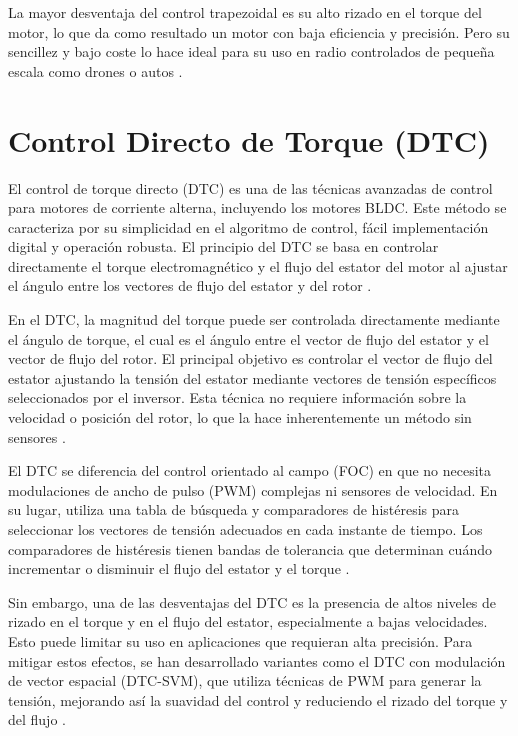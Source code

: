 \documentclass[11pt]{report}
\begin{document}
La mayor desventaja del control trapezoidal es su alto rizado en el torque del motor, lo que da como resultado un motor con baja eficiencia y precisión. Pero su sencillez y bajo coste lo hace ideal para su uso en radio controlados de pequeña escala como drones o autos \cite{juanpere_tecnicas}.

\section{Control Directo de Torque (DTC)}

El control de torque directo (DTC) es una de las técnicas avanzadas de control para motores de corriente alterna, incluyendo los motores BLDC. Este método se caracteriza por su simplicidad en el algoritmo de control, fácil implementación digital y operación robusta. El principio del DTC se basa en controlar directamente el torque electromagnético y el flujo del estator del motor al ajustar el ángulo entre los vectores de flujo del estator y del rotor \cite{power_conv_00}.

En el DTC, la magnitud del torque puede ser controlada directamente mediante el ángulo de torque, el cual es el ángulo entre el vector de flujo del estator y el vector de flujo del rotor. El principal objetivo es controlar el vector de flujo del estator ajustando la tensión del estator mediante vectores de tensión específicos seleccionados por el inversor. Esta técnica no requiere información sobre la velocidad o posición del rotor, lo que la hace inherentemente un método sin sensores \cite{fisher2014high_DTC}.

El DTC se diferencia del control orientado al campo (FOC) en que no necesita modulaciones de ancho de pulso (PWM) complejas ni sensores de velocidad. En su lugar, utiliza una tabla de búsqueda y comparadores de histéresis para seleccionar los vectores de tensión adecuados en cada instante de tiempo. Los comparadores de histéresis tienen bandas de tolerancia que determinan cuándo incrementar o disminuir el flujo del estator y el torque \cite{Bida2018}.

Sin embargo, una de las desventajas del DTC es la presencia de altos niveles de rizado en el torque y en el flujo del estator, especialmente a bajas velocidades. Esto puede limitar su uso en aplicaciones que requieran alta precisión. Para mitigar estos efectos, se han desarrollado variantes como el DTC con modulación de vector espacial (DTC-SVM), que utiliza técnicas de PWM para generar la tensión, mejorando así la suavidad del control y reduciendo el rizado del torque y del flujo \cite{Bida2018}.
\end{document}
